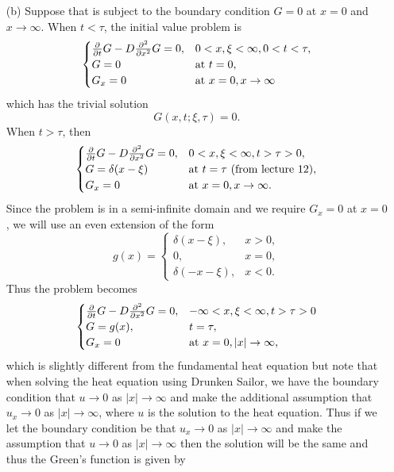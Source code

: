 \documentclass[12pt]{report}
\begin{document}
\begin{solution}
\begin{enumerate}
        \item [(b)]
        Suppose that  is subject to the boundary condition $G=0$ at $x=0$ and $x\to\infty$. When $t < \tau$, the initial value problem is 
        \begin{align*}
            \begin{cases}
                \frac{\partial }{\partial t}G - D\frac{\partial^{2} }{\partial x^{2}}G = 0, &0<x,\xi<\infty, 0 < t < \tau,\\
                G=0 &\text{at}~ t = 0,\\
                G_x=0 &\text{at}~ x=0,x\to\infty
            \end{cases}
        \end{align*}
        which has the trivial solution
        \[
            G(x,t;\xi,\tau) = 0.
        \]
        When $t > \tau$, then 
        \[  
            \begin{cases}
                \frac{\partial }{\partial t}G - D\frac{\partial^{2} }{\partial x^{2}}G = 0, &0<x,\xi<\infty, t > \tau>0,\\
                G=\delta(x-\xi) &\text{at}~ t = \tau ~(\text{from lecture 12}),\\
                G_x=0 &\text{at}~ x=0,x\to\infty.
            \end{cases}
        \]
        Since the problem is in a semi-infinite domain and we require $G_x=0$ at $x=0$, we will use an even extension of the form
        \[ 
            g(x) = \begin{cases}
                \delta(x - \xi), & x>0,\\
                0, & x=0,\\
                \delta(-x -\xi), & x<0.
            \end{cases}
        \]
        Thus the problem becomes
        \[
            \begin{cases}
                \frac{\partial }{\partial t}G - D\frac{\partial^{2} }{\partial x^{2}}G = 0, & -\infty<x,\xi<\infty, t>\tau>0\\
                G = g(x), & t = \tau,\\
                G_x = 0 &\text{at}~ x=0,|x|\to\infty,
            \end{cases}
        \]
        which is slightly different from the fundamental heat equation but note that when solving the heat equation using Drunken Sailor, we have the boundary condition that $u \to 0$ as $|x| \to \infty$ and make the additional assumption that $u_x \to 0$ as $|x| \to \infty$, where $u$ is the solution to the heat equation. Thus if we let the boundary condition be that $u_x \to 0$ as $|x| \to \infty$ and make the assumption that $u \to 0$ as $|x| \to \infty$ then the solution will be the same and thus the Green's function is given by

\end{enumerate}
\end{solution}
\end{document}
